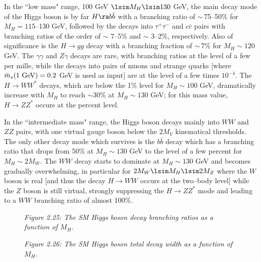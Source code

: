 In the ``low mass" range, 100 GeV $\lsim M_{H}\lsim 130$ GeV,  the main decay
mode of the Higgs boson  is by far $ H \ra b\bar{b}$ with a branching ratio  of
$\sim \, $75--50\% for $M_H = 115$--130 GeV, followed by the decays into 
$\tau^+\tau^-$ and $c\bar{c}$ pairs with branching ratios of the order of 
$\sim$ 7--5\% and $\sim$ 3--2\%, respectively. Also of significance is the 
$H\to gg$ decay with a branching fraction of $\sim \, $7\% for $M_{H} \sim 120$
GeV. The $\gamma \gamma$ and $Z \gamma$ decays are rare, with branching ratios 
at the level of a few per mille, while the decays into pairs of muons and 
strange quarks [where $\bar{m}_s (1~{\rm GeV})=0.2$ GeV is used as input] are 
at the level of a few times $10^{-4}$. The $H \to WW^*$ decays, which are 
below the 1\% level for $M_H \sim 100$ GeV, dramatically increase with $M_H$ 
to reach $\sim 30\%$ at $M_H \sim 130$ GeV; for this mass value, $H\to 
ZZ^*$ occurs at the percent level.\s 

In the ``intermediate mass"  range, the Higgs boson decays mainly  into $WW$
and $ZZ$ pairs, with one virtual gauge boson below the $2M_V$ kinematical 
thresholds. The only other decay mode which survives is the $b\bar{b}$ decay 
which has a branching ratio that drops from 50\% at $M_H \sim 130$ GeV to the 
level of a few  percent for $M_H \sim 2M_W$. The $WW$ decay starts to dominate
at $M_H \sim 130$ GeV and becomes gradually overwhelming, in particular for 
$2M_W \lsim M_H \lsim 2M_Z$ where the $W$ boson is real [and thus the decay 
$H \to WW$ occurs at the two--body level] while the $Z$ boson is still virtual,
strongly suppressing the $H \to ZZ^*$ mode and leading to a $WW$ branching ratio
of almost 100\%.  \s

\begin{figure}[!h]
\begin{center}
\vspace*{-2.cm}
\hspace*{-3cm}
\end{center}
\vspace*{-12.5cm}
\centerline{\it Figure 2.25: The SM Higgs boson decay branching ratios as a 
function of $M_H$.}
\end{figure}


\begin{figure}[!h]
\begin{center}
\vspace*{-2.cm}
\hspace*{-3cm}
\end{center}
\vspace*{-12.5cm}
\centerline{\it Figure 2.26: The SM Higgs boson total decay width as a function
of $M_H$.} 
\end{figure}

